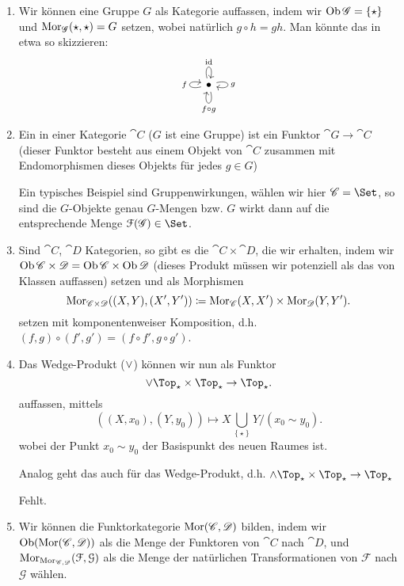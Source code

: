 \begin{example}
    \begin{enumerate}[1)]
        \item Wir können eine Gruppe $G$ als Kategorie auffassen, indem wir  $\operatorname{Ob}{\mathscr{G}} = \left \{\star\right\} $ und $\operatorname{Mor}_{\mathscr{G}}(\star,\star) = G$ setzen, wobei natürlich $g \circ  h = gh$. Man könnte das in etwa so skizzieren:
            \[
\begin{tikzcd}
            \bullet \ar[loop left]{}{f} \ar[loop above]{}{\id} \ar[loop right]{}{g} \ar[loop below]{}{f \circ g}
\end{tikzcd}
\]
\item Ein  in einer Kategorie $\cat{C}$ ($G$ ist eine Gruppe) ist ein Funktor  $\cat{G} \to  \cat{C}$ (dieser Funktor besteht aus einem Objekt von $\cat{C}$ zusammen mit Endomorphismen dieses Objekts für jedes $g\in G$)
    \begin{remark*}
        Ein typisches Beispiel sind Gruppenwirkungen, wählen wir hier $\cat{C} = \Set$, so sind die $G$-Objekte genau  $G$-Mengen bzw.  $G$ wirkt dann auf die entsprechende Menge  $\mathcal{F}(\cat{G})\in \Set$.
    \end{remark*}
\item Sind $\cat{C}$, $\cat{D}$ Kategorien, so gibt es die  $\cat{C} \times  \cat{D}$, die wir erhalten, indem wir $\operatorname{Ob}{\mathscr{C} \times \mathscr{D}} = \operatorname{Ob}{\mathscr{C}} \times \operatorname{Ob}{\mathscr{D}} $ (dieses Produkt müssen wir potenziell als das von Klassen auffassen) setzen und als Morphismen
    \[
        \operatorname{Mor}_{\mathscr{C}\times \mathscr{D}}((X,Y),(X',Y')) \coloneqq  \operatorname{Mor}_{\mathscr{C}}(X,X') \times \operatorname{Mor}_{\mathscr{D}}(Y,Y') 
    .\] 
    setzen mit komponentenweiser Komposition, d.h. $(f,g) \circ  (f', g') = (f \circ  f', g \circ  g')$.
\item Das Wedge-Produkt ($\vee$) können wir nun als Funktor
     \[
    \twedge \Top_{\star} \times \Top_{\star} \to  \Top_{\star}
    .\] 
    auffassen, mittels
    \[
        ((X,x_0),(Y,y_0)) \mapsto X \bigcup\limits_{\left \{\star\right\} }Y / (x_0 \sim  y_0)
    .\] 
wobei der Punkt $x_0 \sim y_0$ der Basispunkt des neuen Raumes ist.


    Analog geht das auch für das Wedge-Produkt, d.h. $\tsmash \Top_{\star} \times  \Top_{\star} \to  \Top_{\star}$ 
    \begin{example}
        Fehlt.
    \end{example}
\item Wir können die Funktorkategorie $\operatorname{Mor}(\mathscr{C},\mathscr{D})$ bilden, indem wir $\operatorname{Ob}(\operatorname{Mor}(\mathscr{C},\mathscr{D}))$ als die Menge der Funktoren von $\cat{C}$ nach $\cat{D}$, und $\operatorname{Mor}_{\operatorname{Mor}_{\mathscr{C},\mathscr{D}}}(\mathcal{F},\mathcal{G})$ als die Menge der natürlichen Transformationen von $\mathcal{F}$ nach $\mathcal{G}$ wählen.
    \end{enumerate}
\end{example}
